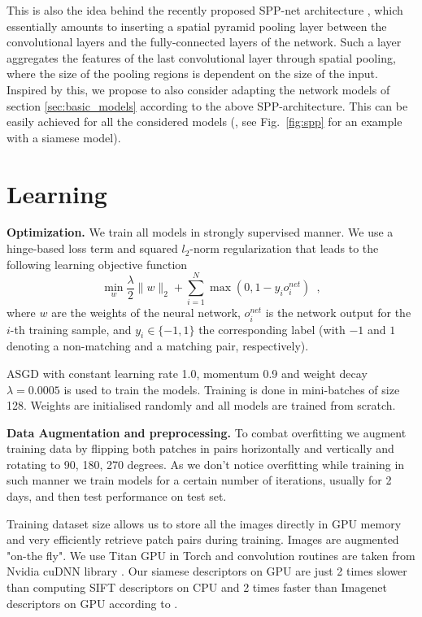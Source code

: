 \documentclass[10pt,twocolumn,letterpaper]{article}
\begin{document}
This is also the idea behind the recently proposed SPP-net architecture \cite{spp}, which essentially amounts to inserting a spatial pyramid pooling layer between the convolutional layers and  the fully-connected layers of the network. Such a layer
aggregates the features of the last convolutional layer through spatial pooling, where the size of the pooling regions is dependent on the size of the input. Inspired by this, we propose to also consider adapting the network models of section \ref{sec:basic_models} according to the above SPP-architecture. This can be easily achieved for all the considered  models (\eg, see Fig.~\ref{fig:spp} for an example with a siamese model). 


\section{Learning}

\textbf{Optimization.} We train all models in strongly supervised manner. We use  a hinge-based loss term and squared $l_2$-norm regularization that leads to the following learning objective function 
\begin{equation}\label{eq:tr_obj1}
\min_{w}\frac{\lambda}{2}\|w\|_2 + \sum_{i=1}^N\max(0, 1 - y_io^{net}_i)\enspace,
\end{equation}
where $w$ are the weights of the neural network, $o^{net}_i$ is the network output  for the $i$-th training sample, and $y_i \in \{-1,1\}$ the corresponding label (with $-1$ and $1$ denoting a non-matching and a matching  pair, respectively).

ASGD with constant learning rate 1.0, 
momentum 0.9 and weight decay $\lambda=0.0005$ is used to train the models. Training is done in 
mini-batches of size 128. Weights are initialised randomly and  all
 models are trained from scratch.

\textbf{Data Augmentation and preprocessing.} To combat overfitting we augment 
training data by flipping both patches in pairs horizontally and vertically and 
rotating to 90, 180, 270 degrees. As we don't notice overfitting while training 
in such manner we train models for a certain number of iterations, usually for 
2 days, and then test performance on test set.

Training dataset size allows us to store all the images directly in GPU memory and 
very efficiently retrieve patch pairs during training. Images are augmented 
"on-the fly". We use Titan GPU in Torch %
\cite{collobert:2011c} and
convolution routines  are taken from Nvidia cuDNN library \cite{cudnn}.
%
Our siamese descriptors on GPU are just 2 times slower than computing SIFT descriptors on CPU
and 2 times faster than Imagenet descriptors on GPU according to \cite{comparison}.
%
%
%
%
%
%
%
%
%
%
\end{document}
